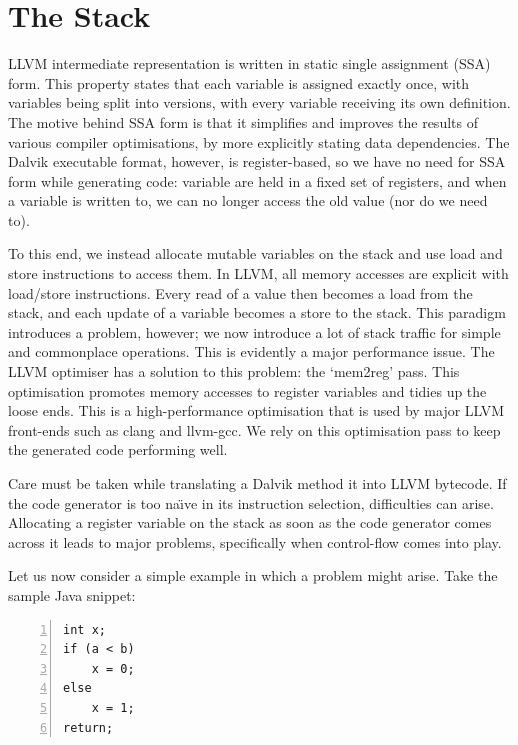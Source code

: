 \section{The Stack}
\label{sec:stack}

LLVM intermediate representation is written in static single assignment (SSA) form. This property states that each variable is assigned exactly once, with variables being split into versions, with every variable receiving its own definition. The motive behind SSA form is that it simplifies and improves the results of various compiler optimisations, by more explicitly stating data dependencies. The Dalvik executable format, however, is register-based, so we have no need for SSA form while generating code: variable are held in a fixed set of registers, and when a variable is written to, we can no longer access the old value (nor do we need to).

To this end, we instead allocate mutable variables on the stack and use load and store instructions to access them. In LLVM, all memory accesses are explicit with load/store instructions. Every read of a value then becomes a load from the stack, and each update of a variable becomes a store to the stack. This paradigm introduces a problem, however; we now introduce a lot of stack traffic for simple and commonplace operations. This is evidently a major performance issue. The LLVM optimiser has a solution to this problem: the `mem2reg' pass. This optimisation promotes memory accesses to register variables and tidies up the loose ends. This is a high-performance optimisation that is used by major LLVM front-ends such as clang and llvm-gcc\footnotemark {}. We rely on this optimisation pass to keep the generated code performing well.

Care must be taken while translating a Dalvik method it into LLVM bytecode. If the code generator is too na\"{\i}ve in its instruction selection, difficulties can arise. Allocating a register variable on the stack as soon as the code generator comes across it leads to major problems, specifically when control-flow comes into play.

Let us now consider a simple example in which a problem might arise. Take the sample Java snippet:

\lstset{
	language=Java,
	basicstyle=\small,
	stringstyle=\ttfamily
}

\begin{lstlisting}[frame=single, numbers=left, numberstyle=\tiny, caption={Java control-flow example}, label=lst:java_br]
int x;
if (a < b)
    x = 0;
else
    x = 1;
return;
\end{lstlisting}


